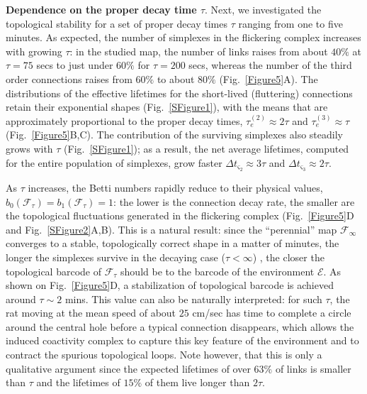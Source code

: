 \documentclass[12pt,tightenlines]{revtex4}
\begin{document}
\textbf{Dependence on the proper decay time $\tau$}. Next, we investigated the topological stability for a set of proper 
decay times $\tau$ ranging from one to five minutes. As expected, the number of simplexes in the flickering complex 
increases with growing $\tau$: in the studied map, the number of links raises from about $40\%$ at $\tau = 75$ 
secs to just under $60\%$ for $\tau = 200$ secs, whereas the number of the third order connections raises from 
$60\%$ to about $80\%$ (Fig.~\ref{Figure5}A). The distributions of the effective lifetimes for the short-lived (fluttering) 
connections retain their exponential shapes (Fig.~\ref{SFigure1}), 
with the means that are approximately proportional to the proper decay times, $\tau^{(2)}_{e} \approx 2\tau$ and 
$\tau^{(3)}_{e} \approx \tau$ (Fig.~\ref{Figure5}B,C). The contribution of the surviving simplexes also steadily grows 
with $\tau$ (Fig.~\ref{SFigure1}); 
as a result, the net average lifetimes, computed for the entire population of simplexes, grow faster
 $\Delta t_{\varsigma_2} \approx 3\tau$ and $\Delta t_{\varsigma_3} \approx 2\tau$.

As $\tau$ increases, the Betti numbers rapidly reduce to their physical values, $b_0(\mathcal{F}_{\tau}) = b_1(\mathcal{F}_{\tau}) = 1$: 
the lower is the connection decay rate, the smaller are the topological fluctuations generated in the flickering complex 
(Fig.~\ref{Figure5}D and Fig.~\ref{SFigure2}A,B). 
This is a natural result: since the ``perennial'' map $\mathcal{F}_{\infty}$ 
converges to a stable, topologically correct shape in a matter of minutes, the longer the simplexes survive in the decaying 
case ($\tau < \infty$) , the closer the topological barcode of $\mathcal{F}_{\tau}$ should be to the barcode of the environment 
$\mathcal{E}$. As shown on Fig.~\ref{Figure5}D, a stabilization of topological barcode is achieved around $\tau \sim 2$ mins. 
This value can also be naturally interpreted: for such $\tau$, the rat moving at the mean speed of about $25$ cm/sec has 
time to complete a circle around the central hole before a typical connection disappears, which allows the induced coactivity 
complex to capture this key feature of the environment and to contract the spurious topological loops. Note however, that 
this is only a qualitative argument since the expected lifetimes of over $63\%$ of links is smaller than $\tau$ and the lifetimes 
of $15\%$ of them live longer than $2\tau$.
 
\end{document}
